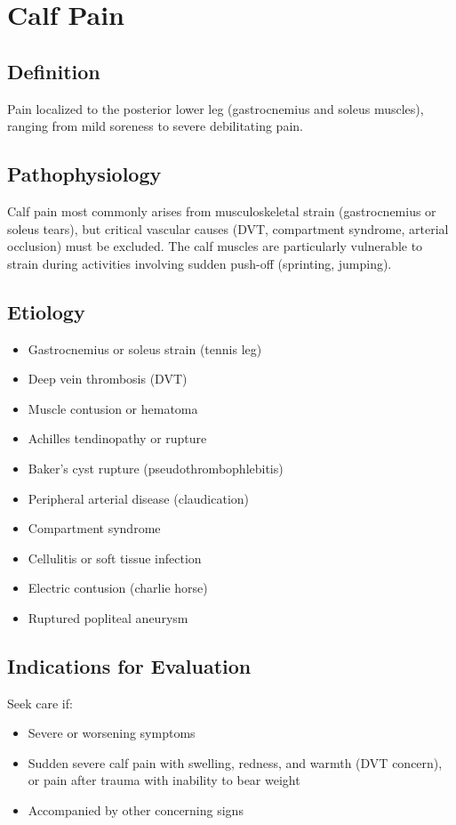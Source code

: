 \chapter{Calf Pain}

\section*{Definition}
Pain localized to the posterior lower leg (gastrocnemius and soleus muscles), ranging from mild soreness to severe debilitating pain.

\section*{Pathophysiology}
Calf pain most commonly arises from musculoskeletal strain (gastrocnemius or soleus tears), but critical vascular causes (DVT, compartment syndrome, arterial occlusion) must be excluded. The calf muscles are particularly vulnerable to strain during activities involving sudden push-off (sprinting, jumping).

\section*{Etiology}
\begin{itemize}
  \item Gastrocnemius or soleus strain (tennis leg)
  \item Deep vein thrombosis (DVT)
  \item Muscle contusion or hematoma
  \item Achilles tendinopathy or rupture
  \item Baker's cyst rupture (pseudothrombophlebitis)
  \item Peripheral arterial disease (claudication)
  \item Compartment syndrome
  \item Cellulitis or soft tissue infection
  \item Electric contusion (charlie horse)
  \item Ruptured popliteal aneurysm
\end{itemize}

\section*{Indications for Evaluation}
Seek care if:
\begin{itemize}
  \item Severe or worsening symptoms
  \item Sudden severe calf pain with swelling, redness, and warmth (DVT concern), or pain after trauma with inability to bear weight
  \item Accompanied by other concerning signs
\end{itemize}

